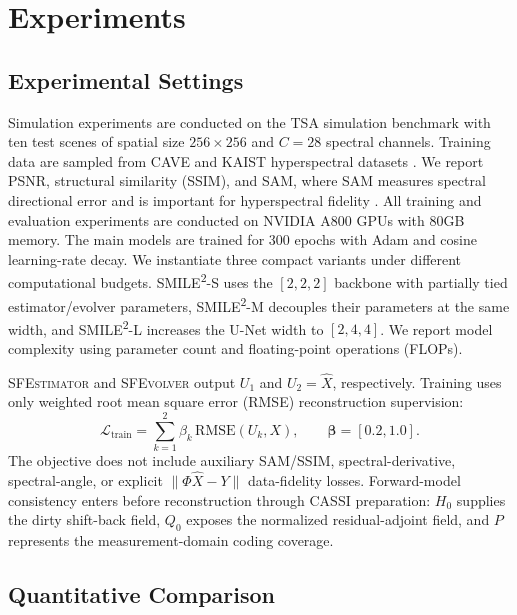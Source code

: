 \documentclass[letterpaper]{article} %
\newcommand{\smiletwo}{SMILE\textsuperscript{2}}
\newcommand{\sfestimator}{\textsc{SFEstimator}}
\newcommand{\sfevolver}{\textsc{SFEvolver}}
\begin{document}
\section{Experiments}

\subsection{Experimental Settings}

Simulation experiments are conducted on the TSA simulation benchmark with ten test scenes of spatial size \(256\times256\) and \(C=28\) spectral channels.
Training data are sampled from CAVE and KAIST hyperspectral datasets \cite{yasuma2010cave,choi2017kaist}.
We report PSNR, structural similarity (SSIM), and SAM, where SAM measures spectral directional error and is important for hyperspectral fidelity \cite{kruse1993sam}.
All training and evaluation experiments are conducted on NVIDIA A800 GPUs with 80GB memory.
The main models are trained for 300 epochs with Adam and cosine learning-rate decay.
We instantiate three compact variants under different computational budgets.
\smiletwo-S uses the \([2,2,2]\) backbone with partially tied estimator/evolver parameters, \smiletwo-M decouples their parameters at the same width, and \smiletwo-L increases the U-Net width to \([2,4,4]\).
We report model complexity using parameter count and floating-point operations (FLOPs).

\sfestimator{} and \sfevolver{} output \(U_1\) and \(U_2=\hat X\), respectively.
Training uses only weighted root mean square error (RMSE) reconstruction supervision:
\begin{equation}
\mathcal{L}_{\mathrm{train}}
=\sum_{k=1}^{2}\beta_k\,\mathrm{RMSE}(U_k,X),
\qquad
\boldsymbol{\beta}=[0.2,1.0].
\label{eq:train_loss_sfe}
\end{equation}
The objective does not include auxiliary SAM/SSIM, spectral-derivative, spectral-angle, or explicit \(\|\Phi\hat X-Y\|\) data-fidelity losses.
Forward-model consistency enters before reconstruction through CASSI preparation: \(H_0\) supplies the dirty shift-back field, \(Q_0\) exposes the normalized residual-adjoint field, and \(P\) represents the measurement-domain coding coverage.

\subsection{Quantitative Comparison}
\end{document}

